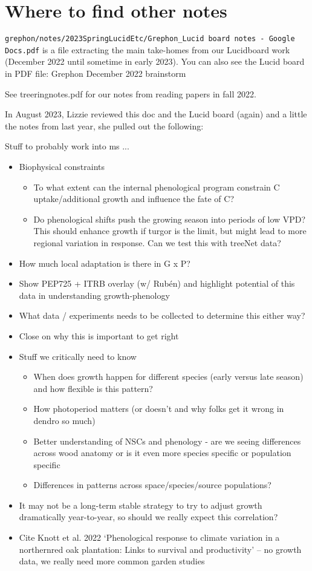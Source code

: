 \documentclass[11pt,letter]{article}
\begin{document}
\section{Where to find other notes}
\verb|grephon/notes/2023SpringLucidEtc/Grephon_Lucid board notes - Google Docs.pdf|  is a file extracting the main take-homes from our Lucidboard work (December 2022 until sometime in early 2023). You can also see the Lucid board in PDF file: Grephon December 2022 brainstorm

See treeringnotes.pdf for our notes from reading papers in fall 2022. 


In August 2023, Lizzie reviewed this doc and the Lucid board (again) and a little the notes from last year, she pulled out the following:

Stuff to probably work into ms ...
\begin{itemize}
\item Biophysical constraints
\begin{itemize}
\item To what extent can the internal phenological program constrain C uptake/additional growth and influence the fate of C?
\item Do phenological shifts push the growing season into periods of low VPD? This should enhance growth if turgor is the limit, but might lead to more regional variation in response. Can we test this with treeNet data?
\end{itemize}
\item How much local adaptation is there in G x P?
\item Show PEP725 + ITRB overlay (w/ Rubén) and highlight potential of this data in understanding growth-phenology
\item  What data / experiments needs to be collected to determine this either way?
\item Close on why this is important to get right
\item Stuff we critically need to know
\begin{itemize}
\item When does growth happen for different species (early versus late season) and how flexible is this pattern?
\item How photoperiod matters (or doesn't and why folks get it wrong in dendro so much)
\item Better understanding of NSCs and phenology - are we seeing differences across wood anatomy or is it even more species specific or population specific
\item Differences in patterns across space/species/source populations?
\end{itemize}
\item It may not be a long-term stable strategy to try to adjust growth dramatically year-to-year, so should we really expect this correlation?
\item Cite Knott et al. 2022 `Phenological response to climate variation in a northernred oak plantation: Links to survival and productivity' -- no growth data, we really need more common garden studies
\end{itemize}
\end{document}
